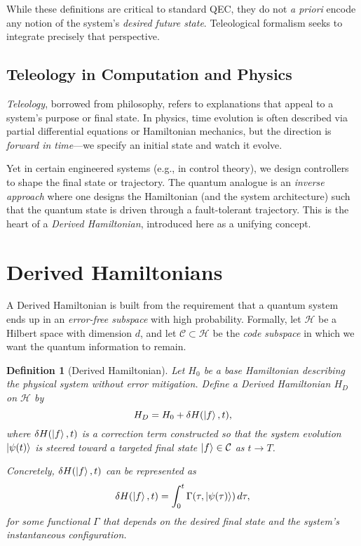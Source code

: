 \documentclass[11pt]{article}
\newtheorem{definition}{Definition}
\begin{document}
While these definitions are critical to standard QEC, they do not \emph{a priori} encode any notion of the system’s \emph{desired future state}. Teleological formalism seeks to integrate precisely that perspective.

\subsection{Teleology in Computation and Physics}
\emph{Teleology}, borrowed from philosophy, refers to explanations that appeal to a system’s purpose or final state. In physics, time evolution is often described via partial differential equations or Hamiltonian mechanics, but the direction is \emph{forward in time}---we specify an initial state and watch it evolve. 

Yet in certain engineered systems (e.g., in control theory), we design controllers to shape the final state or trajectory. The quantum analogue is an \emph{inverse approach} where one designs the Hamiltonian (and the system architecture) such that the quantum state is driven through a fault-tolerant trajectory. This is the heart of a \emph{Derived Hamiltonian}, introduced here as a unifying concept.

\section{Derived Hamiltonians}
A Derived Hamiltonian is built from the requirement that a quantum system ends up in an \emph{error-free subspace} with high probability. Formally, let $\mathcal{H}$ be a Hilbert space with dimension $d$, and let $\mathcal{C} \subset \mathcal{H}$ be the \emph{code subspace} in which we want the quantum information to remain.

\begin{definition}[Derived Hamiltonian]
Let $H_0$ be a base Hamiltonian describing the physical system without error mitigation. Define a \emph{Derived Hamiltonian} $H_D$ on $\mathcal{H}$ by
\begin{equation}
H_D = H_0 + \delta H(\ket{f}, t),
\end{equation}
where $\delta H(\ket{f}, t)$ is a correction term constructed so that the system evolution $\ket{\psi(t)}$ is \emph{steered} toward a targeted final state $\ket{f} \in \mathcal{C}$ as $t \to T$. 

Concretely, $\delta H(\ket{f}, t)$ can be represented as
\begin{equation}
\delta H(\ket{f}, t) = \int_0^t \Gamma(\tau, \ket{\psi(\tau)})\, d\tau,
\end{equation}
for some functional $\Gamma$ that depends on the \emph{desired} final state and the system’s instantaneous configuration.
\end{definition}
\end{document}
